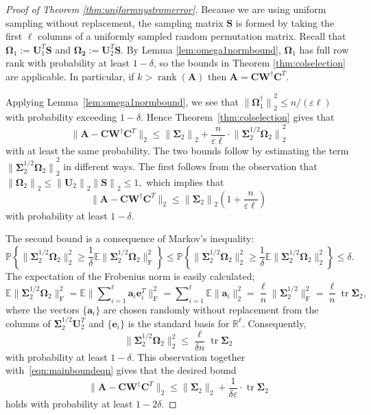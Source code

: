 \documentclass[11pt,letterpaper,twoside,reqno,nosumlimits]{amsart}
\def\pinv{\dagger}
\def\transp{T}
\newcommand{\mat}[1]{\ensuremath{\mathbf{#1}}}
\renewcommand{\vec}[1]{\ensuremath{\mathbf{#1}}}
\newcommand{\E}{\ensuremath{\mathbb{E}}}
\newcommand{\Prob}[1]{\ensuremath{\mathbb{P}\left\{#1\right\}}}
\newcommand{\R}{\ensuremath{\mathbb{R}}}
\newcommand{\norm}[1]{\ensuremath{\big\|#1\big\|}}
\newcommand{\snorm}[1]{\ensuremath{\big\|#1\big\|_2}}
\newcommand{\snorms}[1]{\ensuremath{\big\|#1\big\|_2^2}}
\newcommand{\fnorms}[1]{\ensuremath{\big\|#1\big\|_{\mathrm{F}}^2}}
\DeclareMathOperator{\tr}{tr}
\DeclareMathOperator{\rank}{rank}
\theoremstyle{remark}
\begin{document}
\begin{proof}[Proof of Theorem \ref{thm:uniformnystromerror}]
Because we are using uniform sampling without replacement, the sampling matrix $\mat{S}$ is formed by taking the first $\ell$ columns of a uniformly sampled random permutation matrix. Recall that $\mat{\Omega}_1 := \mat{U}_1^\transp \mat{S}$ and $\mat{\Omega_2} := \mat{U}_2^\transp \mat{S}.$ By Lemma \ref{lem:omega1normbound}, $\mat{\Omega}_1$ has full row rank with probability at least $1-\delta$, so the bounds in Theorem \ref{thm:colselection} are applicable. In particular, if $k > \rank(\mat{A})$ then $\mat{A} = \mat{C}\mat{W}^\pinv \mat{C}^\transp.$

Applying Lemma~\ref{lem:omega1normbound}, we see that $\norm{\mat{\Omega}_1^\pinv}_2^2 \leq n/(\varepsilon \ell)$ with probability exceeding $1-\delta.$ Hence Theorem~\ref{thm:colselection} gives that 
\begin{equation}
 \label{eqn:mainboundeqn} 
 \|\mat{A} - \mat{C} \mat{W}^\pinv \mat{C}^\transp\|_2 \leq \norm{\mat{\Sigma}_2}_2 + \frac{n}{\varepsilon \ell} \cdot \norm{\mat{\Sigma}_2^{1/2} \mat{\Omega}_2}_2^2
\end{equation}
with at least the same probability. The two bounds follow by estimating the term $\norm{\mat{\Sigma}_2^{1/2} \mat{\Omega}_2}_2^2$ in different ways. The first follows from the observation that $\norm{\mat{\Omega}_2}_2 \leq  \norm{\mat{U}_2}_2 \norm{\mat{S}}_2 \leq 1,$ which implies that 
\[
 \|\mat{A} - \mat{C} \mat{W}^\pinv \mat{C}^\transp\|_2 \leq \norm{\mat{\Sigma}_2}_2\left(1 + \frac{n}{\varepsilon \ell}\right)
\]
with probability at least $1 - \delta.$ 

The second bound is a consequence of Markov's inequality:
\[
\Prob{\snorms{\mat{\Sigma}_2^{1/2} \mat{\Omega}_2} \geq \frac{1}{\delta} \E \fnorms{\mat{\Sigma}_2^{1/2} \mat{\Omega}_2} } \leq \Prob{\snorms{\mat{\Sigma}_2^{1/2} \mat{\Omega}_2} \geq \frac{1}{\delta} \E \snorms{\mat{\Sigma}_2^{1/2} \mat{\Omega}_2} } \leq \delta.
\]
The expectation of the Frobenius norm is easily calculated;
\[
 \E \fnorms{\mat{\Sigma}_2^{1/2} \mat{\Omega}_2} = \E \fnorms{\sum\nolimits_{i=1}^\ell \vec{a}_i\vec{e}_i^\transp} = \sum\nolimits_{i=1}^\ell \E \|\vec{a}_i\|_2^2 = \frac{\ell}{n} \fnorms{\mat{\Sigma}_2^{1/2}} = \frac{\ell}{n} \tr \mat{\Sigma}_2,
\]
where the vectors $\{\vec{a}_i\}$ are chosen randomly without replacement from the columns of $\mat{\Sigma}_2^{1/2} \mat{U}_2^\transp$ and $\{\vec{e}_i\}$ is the standard basis for $\R^\ell.$ Consequently,
\[
 \snorms{\mat{\Sigma}_2^{1/2} \mat{\Omega}_2} \leq \frac{\ell}{\delta n} \tr \mat{\Sigma}_2
\]
with probability at least $1-\delta.$ This observation together with~\eqref{eqn:mainboundeqn} gives that the desired bound
\[
 \|\mat{A} - \mat{C} \mat{W}^\pinv \mat{C}^\transp\|_2 \leq \snorm{\mat{\Sigma}_2} + \frac{ 1}{\delta \varepsilon } \cdot \tr \mat{\Sigma}_2
\]
holds with probability at least $1-2\delta.$
\end{proof}
\end{document}
